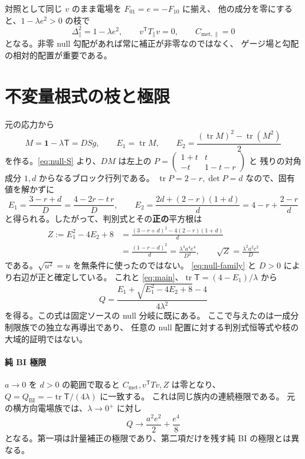 \documentclass[11pt,a4paper]{article}
\newcommand{\tr}{\operatorname{tr}}
\newcommand{\Id}{\mathbf{1}}
\newcommand{\Tmix}{\mathsf{T}}
\newcommand{\Qbi}{Q_{\mathrm{BI}}}
\newcommand{\Cmet}{C_{\mathrm{met}}}
\begin{document}
対照として同じ $v$ のまま電場を $F_{01}=e=-F_{10}$ に揃え、
他の成分を零にすると、$1-\lambda e^2>0$ の枝で
\begin{equation}\label{eq:aligned}
\Delta_{\parallel}^2=1-\lambda e^2,\qquad
v^{\mathsf T}T_{\parallel}v=0,\qquad
C_{\mathrm{met},\parallel}=0
\end{equation}
となる。非零 null 勾配があれば常に補正が非零なのではなく、
ゲージ場と勾配の相対的配置が重要である。

\newpage
\section{不変量根式の枝と極限}
元の応力から
\begin{equation}\label{eq:invariants}
M=\Id-\lambda\Tmix=DSg,\qquad
E_1=\tr M,\qquad E_2=\frac{(\tr M)^2-\tr(M^2)}2
\end{equation}
を作る。\eqref{eq:null-S} より、$DM$ は左上の
$P=\left(\begin{smallmatrix}1+t&t\\-t&1-t-r\end{smallmatrix}\right)$ と
残りの対角成分 $1,d$ からなるブロック行列である。
$\tr P=2-r,\det P=d$ なので、固有値を解かずに
\begin{equation}\label{eq:E12}
E_1=\frac{3-r+d}{D}=\frac{4-2r-t\,r}{D},\qquad
E_2=\frac{2d+(2-r)(1+d)}{d}=4-r+\frac{2-r}{d}
\end{equation}
と得られる。したがって、判別式とその\textbf{正の}平方根は
\begin{equation}\label{eq:discriminant}
\begin{split}
Z:=E_1^2-4E_2+8
 &=\frac{(3-r+d)^2-4(2-r)(1+d)}{d}\\
 &=\frac{(1-r-d)^2}{d}
 =\frac{\lambda^4a^4e^4}{D^2},\qquad
\sqrt Z=\frac{\lambda^2a^2e^2}{D}
\end{split}
\end{equation}
である。$\sqrt{u^2}=u$ を無条件に使ったのではない。
\eqref{eq:null-family} と $D>0$ により右辺が正と確定している。
これと \eqref{eq:main}、$\tr\Tmix=(4-E_1)/\lambda$ から
\begin{equation}\label{eq:null-root}
\boxed{\displaystyle
Q=\frac{E_1+\sqrt{E_1^2-4E_2+8}-4}{4\lambda^2} }
\end{equation}
を得る。この式は固定ソースの null 分岐に既にある。
ここで与えたのは一成分制限族での独立な再導出であり、
任意の null 配置に対する判別式恒等式や枝の大域的証明ではない。

\paragraph{純 BI 極限}
$a\to0$ を $d>0$ の範囲で取ると $\Cmet,v^{\mathsf T}Tv,Z$ は零となり、
$Q=\Qbi=-\tr\Tmix/(4\lambda)$ に一致する。
これは同じ族内の連続極限である。
元の横方向電場族では、$\lambda\to0^+$ に対し
\begin{equation}\label{eq:weak}
Q\longrightarrow\frac{a^2e^2}{2}+\frac{e^4}{8}
\end{equation}
となる。第一項は計量補正の極限であり、第二項だけを残す純 BI の極限とは異なる。
\end{document}
